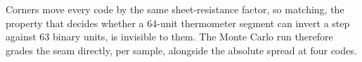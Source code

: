%
%
%
%

Corners move every code by the same sheet-resistance factor, so matching,
the property that decides whether a 64-unit thermometer segment can invert a
step against 63 binary units, is invisible to them. The Monte Carlo run
therefore grades the seam directly, per sample, alongside the absolute spread
at four codes.

